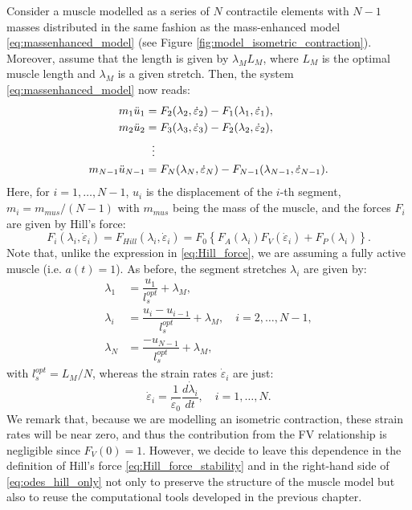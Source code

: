 \documentclass{sfuthesis}
\numberwithin{equation}{section}
\numberwithin{figure}{chapter}
\numberwithin{table}{chapter}
\theoremstyle{definition}
\newcommand{\depsilon}{\dot{\varepsilon}}
\begin{document}
Consider a muscle modelled as a series of $N$ contractile elements with $N-1$ masses distributed in the same fashion as the mass-enhanced model \eqref{eq:massenhanced_model} (see Figure \ref{fig:model_isometric_contraction}). Moreover, assume that the length is given by $\lambda_M L_M$, where $L_M$ is the optimal muscle length and $\lambda_M$ is a given stretch. Then, the system \eqref{eq:massenhanced_model} now reads:
\begin{subequations} \label{eq:odes_hill_only}
    \begin{align}
        m_1 \ddot{u}_1 &= F_2(\lambda_2, \depsilon_2) - F_1(\lambda_1, \depsilon_1), \\
        m_2 \ddot{u}_2 &= F_3(\lambda_3,\depsilon_3) - F_2(\lambda_2,\depsilon_2), \\
        &\hspace{0.6em} \vdots \notag \\
        m_{N-1} \ddot{u}_{N-1} &= F_N(\lambda_N, \depsilon_N) - F_{N-1}(\lambda_{N-1}, \depsilon_{N-1}).
    \end{align}
\end{subequations}
Here, for $i=1,\dots,N-1$, $u_i$ is the displacement of the $i$-th segment, $m_i = m_{mus} / (N-1)$ with $m_{mus}$ being the mass of the muscle, and the forces $F_i$ are given by Hill's force:
\begin{equation} \label{eq:Hill_force_stability}
    F_i(\lambda_i, \depsilon_i) = F_{Hill}(\lambda_i,\depsilon_i) = F_0 \left\{ F_A(\lambda_i) F_V(\depsilon_i) + F_P(\lambda_i) \right\}.    
\end{equation}
Note that, unlike the expression in \eqref{eq:Hill_force}, we are assuming a fully active muscle (i.e. $a(t) = 1$). As before, the segment stretches $\lambda_i$ are given by:
\begin{subequations} \label{eq:def_stretches_stability}
   \begin{align}
        \lambda_1 &= \dfrac{u_1}{l_s^{opt}} + \lambda_M, \\
        \lambda_i &= \dfrac{u_i-u_{i-1}}{l_s^{opt}} + \lambda_M, \quad i=2,\dots,N-1, \\
        \lambda_N &= \dfrac{-u_{N-1}}{l_s^{opt}} + \lambda_M,
   \end{align}
\end{subequations}
with $l_s^{opt} = L_M / N$, whereas the strain rates $\depsilon_i$ are just:
\begin{equation} \label{eq:def_strain_rates_stability}
    \depsilon_i = \dfrac{1}{\depsilon_0} \dfrac{d\dot\lambda_i}{dt}, \quad i=1,\dots,N.
\end{equation}
We remark that, because we are modelling an isometric contraction, these strain rates will be near zero, and thus the contribution from the FV relationship is negligible since $F_V(0) = 1$. However, we decide to leave this dependence in the definition of Hill's force \eqref{eq:Hill_force_stability} and in the right-hand side of \eqref{eq:odes_hill_only} not only to preserve the structure of the muscle model but also to reuse the computational tools developed in the previous chapter.
\end{document}
